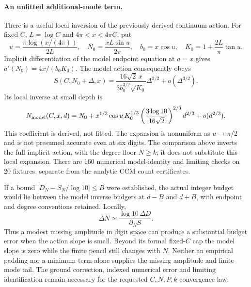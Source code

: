 \paragraph{An unfitted additional-mode term.}
There is a useful local inversion of the previously derived continuum
action. For fixed $C$, $L=\log C$ and $4\pi<x<4\pi C$, put
\[
 u=\frac{\pi\log(x/(4\pi))}{2L},\quad
 N_0=\frac{xL\sin u}{2\pi},\quad b_0=x\cos u,\quad
 K_0=1+\frac{2L}{\pi}\tan u.
\]
Implicit differentiation of the model endpoint equation at $a=x$
gives $a'(N_0)=4x/(b_0K_0)$. The model action consequently obeys
\[
 S(C,N_0+\Delta,x)
 =\frac{16\sqrt2\,x}{3b_0^{3/2}\sqrt{K_0}}\Delta^{3/2}
       +o(\Delta^{3/2}).
\]
Its local inverse at small depth is
\[
 N_{\rm model}(C,x,d)=N_0+
 x^{1/3}\cos u\,K_0^{1/3}
 \left(\frac{3\log10}{16\sqrt2}\right)^{2/3}d^{2/3}
 +o(d^{2/3}).
\]
This coefficient is derived, not fitted. The expansion is nonuniform
as $u\to\pi/2$ and is not presumed accurate even at six digits.
The comparison above inverts the full implicit action, with the degree
floor $N\ge k$; it does not substitute this local expansion. There are
160 numerical model-identity and limiting checks on 20 fixtures,
separate from the analytic CCM count certificates.

If a bound $|D_N-S_N/\log10|\le B$ were established, the actual integer
budget would lie between the model inverse budgets at $d-B$ and $d+B$,
with endpoint and degree conventions retained. Locally,
\[
 \Delta N\simeq\frac{\log10\,\Delta D}{\partial_NS}.
\]
Thus a modest missing amplitude in digit space can produce a substantial
budget error when the action slope is small. Beyond its formal fixed-$C$
cap the model slope is zero while the finite pencil still changes with
$N$. Neither an empirical padding nor a minimum term alone supplies
the missing amplitude and finite-mode tail. The ground correction,
indexed numerical error and limiting identification remain necessary
for the requested $C,N,P,k$ convergence law.
